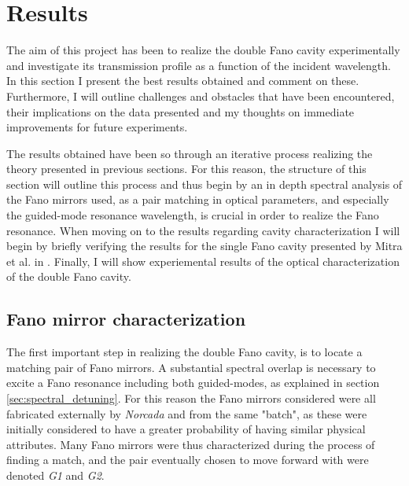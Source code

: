 \section{Results}

The aim of this project has been to realize the double Fano cavity experimentally and investigate its transmission profile as a function of the incident wavelength. In this section I present the best results obtained and comment on these. Furthermore, I will outline challenges and obstacles that have been encountered, their implications on the data presented and my thoughts on immediate improvements for future experiments. 

The results obtained have been so through an iterative process realizing the theory presented in previous sections. For this reason, the structure of this section will outline this process and thus begin by an in depth spectral analysis of the Fano mirrors used, as a pair matching in optical parameters, and especially the guided-mode resonance wavelength, is crucial in order to realize the Fano resonance. When moving on to the results regarding cavity characterization I will begin by briefly verifying the results for the single Fano cavity presented by Mitra et al. in \cite{Mitra}. Finally, I will show experiemental results of the optical characterization of the double Fano cavity. 

\subsection{Fano mirror characterization}\label{sec:results_fano_mirror_characterization}

The first important step in realizing the double Fano cavity, is to locate a matching pair of Fano mirrors. A substantial spectral overlap is necessary to excite a Fano resonance including both guided-modes, as explained in section \ref{sec:spectral_detuning}. For this reason the Fano mirrors considered were all fabricated externally by \emph{Norcada} and from the same "batch", as these were initially considered to have a greater probability of having similar physical attributes. Many Fano mirrors were thus characterized during the process of finding a match, and the pair eventually chosen to move forward with were denoted \emph{G1} and \emph{G2}. 

